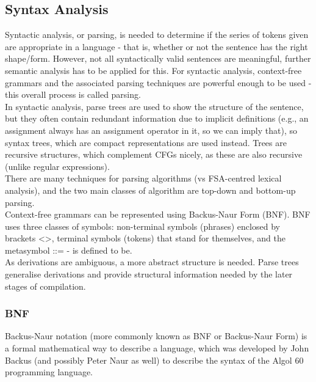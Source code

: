 \subsection{Syntax Analysis }

Syntactic analysis, or parsing, is needed to determine if the series of tokens given are appropriate in a language - that is, whether or not the sentence has the right shape/form. However, not all syntactically valid sentences are meaningful, further semantic analysis has to be applied for this. For syntactic analysis, context-free grammars and the associated parsing techniques are powerful enough to be used - this overall process is called parsing.\\

In syntactic analysis, parse trees are used to show the structure of the sentence, but they often contain redundant information due to implicit definitions (e.g., an assignment always has an assignment operator in it, so we can imply that), so syntax trees, which are compact representations are used instead. Trees are recursive structures, which complement CFGs nicely, as these are also recursive (unlike regular expressions).\\

There are many techniques for parsing algorithms (vs FSA-centred lexical analysis), and the two main classes of algorithm are top-down and bottom-up parsing.\\

Context-free grammars can be represented using Backus-Naur Form (BNF). BNF uses three classes of symbols: non-terminal symbols (phrases) enclosed by brackets <>, terminal symbols (tokens) that stand for themselves, and the metasymbol ::= - is defined to be.\\

As derivations are ambiguous, a more abstract structure is needed. Parse trees generalise derivations and provide structural information needed by the later stages of compilation.

\subsubsection{BNF} 

Backus-Naur notation (more commonly known as BNF or Backus-Naur Form) is a formal mathematical way to describe a language, which was developed by John Backus (and possibly Peter Naur as well) to describe the syntax of the Algol 60 programming language.

